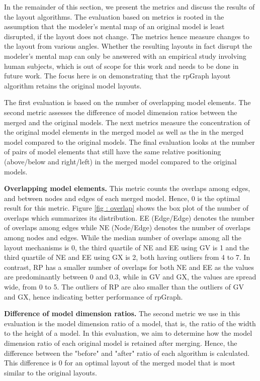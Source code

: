 In the remainder of this section, we present the metrics and discuss the results of the layout algorithms. The evaluation based on metrics is rooted in the assumption that the modeler's mental map of an original model is least disrupted, if the layout does not change.  The metrics hence measure changes to the layout from various angles. Whether the resulting layouts in fact disrupt the modeler's mental map can only be answered with an empirical study involving human subjects, which is out of scope for this work and needs to be done in future work. The focus here is on demonstrating that the rpGraph layout algorithm retains the original model layouts.

The first evaluation is based on the number of overlapping model elements. The second metric assesses the difference of model dimension ratios between the merged and the original models. The next metrics measure the concentration of the original model elements in the merged model as well as the   in the merged model compared to the original models. The final evaluation looks at the number of pairs of model elements that still have the same relative positioning (above/below and right/left) in the merged model compared to the original models.

\textbf{Overlapping model elements.} This metric counts the overlaps among edges, and between nodes and edges of each merged model. Hence, 0 is the optimal result for this metric. Figure \ref{fig : overlap} shows the box plot of the number of overlaps which summarizes its distribution. EE (Edge/Edge) denotes the number of overlaps among edges while NE (Node/Edge) denotes the number of overlaps among nodes and edges. While the median number of overlaps among all the layout mechanisms is 0, the third quartile of NE and EE using GV is 1 and the third quartile of NE and EE using GX is 2, both having outliers from 4 to 7. In contrast, RP has a smaller number of overlaps for both NE and EE as the values are predominantly between 0 and 0.3, while in GV and GX, the values are spread wide, from 0 to 5. The outliers of RP are also smaller than the outliers of GV and GX, hence indicating better performance of rpGraph.

\textbf{Difference of model dimension ratios.} The second metric we use in this evaluation is the model dimension ratio of a model, that is, the ratio of the width to the height of a model. In this evaluation, we aim to determine how the model dimension ratio of each original model is retained after merging. Hence, the difference between the "before" and "after"  ratio of each algorithm is calculated. This difference is 0 for an optimal layout of the merged model that is most similar to the original layouts.

